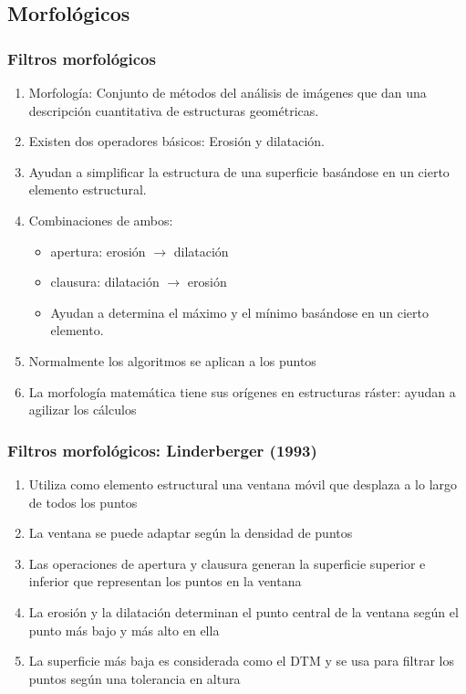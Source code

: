 \subsection{Morfológicos}
\begin{frame}
  \frametitle{Filtros morfológicos}
  \begin{enumerate}
    \item \alert{Morfología}: Conjunto de métodos del análisis de imágenes que
      dan una descripción cuantitativa de estructuras geométricas.
    \item Existen dos operadores básicos: \alert{Erosión} y \alert{dilatación}.
    \item Ayudan a simplificar la estructura de una superficie basándose en un
      cierto elemento estructural.
    \item Combinaciones de ambos:
      \begin{itemize}
        \item \alert{apertura}: erosión $\to$ dilatación
        \item \alert{clausura}: dilatación $\to$ erosión
        \item Ayudan a determina el máximo y el mínimo basándose en un cierto elemento.
      \end{itemize}
    \item Normalmente los algoritmos se aplican a los puntos 
    \item La morfología matemática tiene sus orígenes en estructuras ráster:
      ayudan a agilizar los cálculos
  \end{enumerate}
\end{frame}
\begin{frame}
  \frametitle{Filtros morfológicos: Linderberger (1993)}
  \begin{enumerate}
    \item Utiliza como elemento estructural una ventana móvil que desplaza 
      a lo largo de todos los puntos
    \item La ventana se puede adaptar según la densidad de puntos
    \item Las operaciones de apertura y clausura generan la superficie superior
      e inferior que representan los puntos en la ventana
    \item La erosión y la dilatación determinan el punto central de la ventana
      según el punto más bajo y más alto en ella
    \item La superficie más baja es considerada como el DTM y se usa para
      filtrar los puntos según una tolerancia en altura
  \end{enumerate}
\end{frame}
